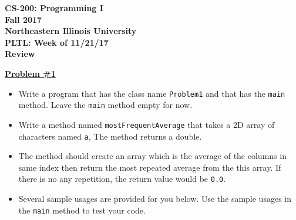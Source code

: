 \documentclass[12pt]{article}
\begin{document}
\begin{center}
	\textbf{CS-200: Programming I}\\
	\textbf{Fall 2017}\\
	\textbf{Northeastern Illinois University}\\
	\textbf{PLTL: Week of 11/21/17}\\
	\textbf{Review}
\end{center}


\noindent\underline{\textbf{Problem \#1}}
\begin{itemize}
	\item Write a program that has the class name \texttt{Problem1} and that has the \texttt{main} method. Leave the \texttt{main} method empty for now.
	\item Write a method named \texttt{mostFrequentAverage} that takes a 2D array of characters named \texttt{a},  The method returns a double.
	\item The method should create an array which is the average of the columns in same index then return the most repeated average from the this array. If there is no any repetition, the return value would be \texttt{0.0}.
	\item Several sample usages are provided for you below. Use the sample usages in the \texttt{main} method to test your code.
\end{itemize}
\end{document}
